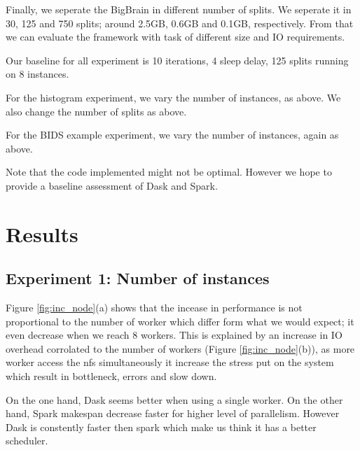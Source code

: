 \documentclass[11pt,a4paper]{article}
\begin{document}
Finally, we seperate the BigBrain in different number of splits. We seperate it in
30, 125 and 750 splits; around 2.5GB, 0.6GB and 0.1GB, respectively. From that we can
evaluate the framework with task of different size and IO requirements.

Our baseline for all experiment is 10 iterations, 4 sleep delay, 125 splits running
on 8 instances.

For the histogram experiment, we vary the number of instances, as above. We also
change the number of splits as above.

For the BIDS example experiment, we vary the number of instances, again as above.

Note that the code implemented might not be optimal. However we hope to provide a
baseline assessment of Dask and Spark.


\section{Results}

\subsection{Experiment 1: Number of instances}
Figure \ref{fig:inc_node}(a) shows that the incease in performance is not
proportional to the number of worker which differ form what we would expect; it even
decrease when we reach 8 workers. This is explained by an increase in IO overhead
corrolated to the number of workers (Figure \ref{fig:inc_node}(b)), as more worker
access the nfs simultaneously it increase the stress put on the system which result
in bottleneck, errors and slow down.

On the one hand, Dask seems better when using a single worker. On the other hand,
Spark makespan decrease faster for higher level of parallelism. However Dask is
constently faster then spark which make us think it has a better scheduler.
\end{document}
